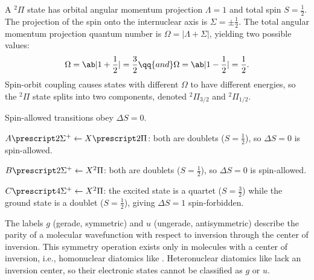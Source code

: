 \begin{solution}\leavevmode
  \begin{enumext}
    \item A $^2\Pi$ state has orbital angular momentum projection $\Lambda = 1$
    and total spin $S = \frac12$. The projection of the spin onto the
    internuclear axis is $\Sigma = \pm\frac12$. The total angular momentum
    projection quantum number is $\Omega = |\Lambda + \Sigma|$, yielding two
    possible values:
    \[
    \Omega = \ab|1 + \frac12| = \frac32 \qq{and}
    \Omega = \ab|1 - \frac12| = \frac12.
    \]
    Spin-orbit coupling causes states with different $\Omega$ to have different
    energies, so the $^2\Pi$ state splits into two components,
    denoted $^2\Pi_{3/2}$ and $^2\Pi_{1/2}$.
    \item Spin-allowed transitions obey $\Delta S = 0$.
    \begin{enumext}
      \item $A \prescript2{}\Sigma^+ \leftarrow X \prescript2{}\Pi$: both are
      doublets ($S = \frac12$), so $\Delta S = 0$ is spin-allowed.
      \item $B \prescript2{}\Sigma^+ \leftarrow X {^2\Pi}$: both are doublets
      ($S = \frac12$), so $\Delta S = 0$ is spin-allowed.
      \item $C \prescript4{}\Sigma^+ \leftarrow X {^2\Pi}$: the excited state is a
      quartet ($S = \frac32$) while the ground state is a doublet
      ($S = \frac12$), giving $\Delta S = 1$ spin-forbidden.
    \end{enumext}
    \item The labels $g$ (gerade, symmetric) and $u$ (ungerade, antisymmetric)
    describe the parity of a molecular wavefunction with respect to inversion
    through the center of inversion. This symmetry operation exists only in
    molecules with a center of inversion, i.e., homonuclear diatomics like
    . Heteronuclear diatomics like  lack an inversion center, so
    their electronic states cannot be classified as $g$ or $u$.
  \end{enumext}
\end{solution}


